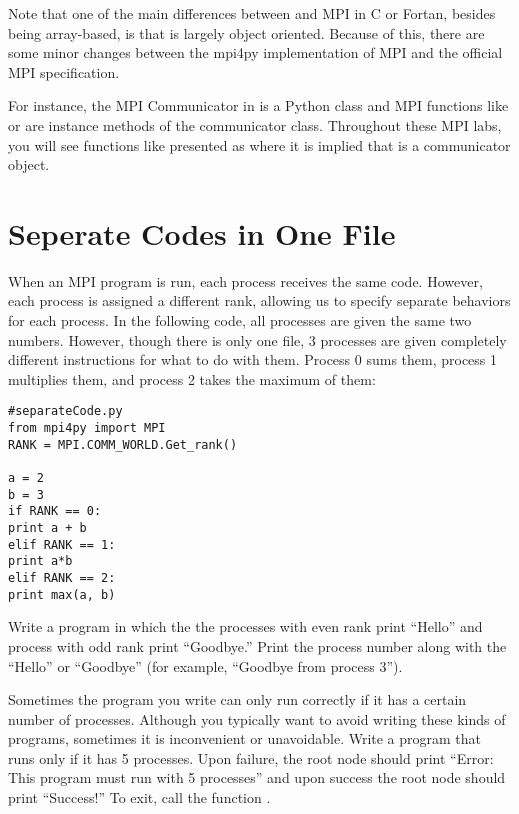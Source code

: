 


Note that one of the main differences between  and MPI in C or Fortan, besides being array-based, is that  is largely object oriented. Because of this, there are some minor changes between the mpi4py implementation of MPI and the official MPI specification.

For instance, the MPI Communicator in  is a Python class and MPI functions like  or  are instance methods of the communicator class. Throughout these MPI labs, you will see functions like  presented as  where it is implied that  is a communicator object.

\section*{Seperate Codes in One File}
When an MPI program is run, each process receives the same code. However, each process is assigned a different rank, allowing us to specify separate behaviors for each process. In the following code, all processes are given the same two numbers. However, though there is only one file, 3 processes are given completely different instructions for what to do with them. Process 0 sums them, process 1 multiplies them, and process 2 takes the maximum of them:

\begin{lstlisting}
#separateCode.py
from mpi4py import MPI
RANK = MPI.COMM_WORLD.Get_rank()

a = 2
b = 3
if RANK == 0:
print a + b
elif RANK == 1:
print a*b
elif RANK == 2:
print max(a, b)
\end{lstlisting}

\begin{problem}
Write a program in which the the processes with even rank print ``Hello'' and process with odd rank print ``Goodbye.'' Print the process number along with the ``Hello'' or ``Goodbye'' (for example, ``Goodbye from process 3'').
\end{problem}

\begin{problem}
Sometimes the program you write can only run correctly if it has a certain number of processes. Although you typically want to avoid writing these kinds of programs, sometimes it is inconvenient or unavoidable. Write a program that runs only if it has 5 processes. Upon failure, the root node should print ``Error: This program must run with 5 processes'' and upon success the root node should print ``Success!'' To exit, call the function .
\end{problem}
